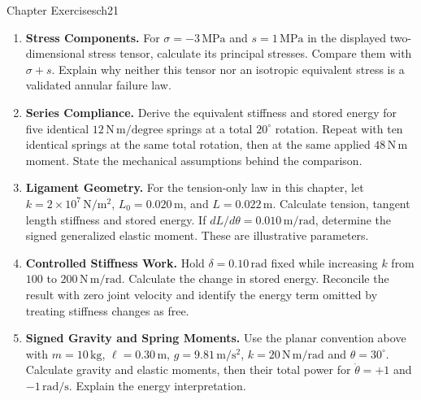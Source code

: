 \begin{exercises}{Chapter Exercises}{ch21}
\begin{enumerate}[leftmargin=*,itemsep=8pt,topsep=4pt]
\item \begin{minipage}[t]{\linewidth}
\textbf{Stress Components.} For $\sigma=-3\,\mathrm{MPa}$ and $s=1\,\mathrm{MPa}$ in the displayed two-dimensional stress tensor, calculate its principal stresses. Compare them with $\sigma+s$. Explain why neither this tensor nor an isotropic equivalent stress is a validated annular failure law.
\end{minipage}

\item \begin{minipage}[t]{\linewidth}
\textbf{Series Compliance.} Derive the equivalent stiffness and stored energy for five identical $12\,\mathrm{N\,m/degree}$ springs at a total $20^\circ$ rotation. Repeat with ten identical springs at the same total rotation, then at the same applied $48\,\mathrm{N\,m}$ moment. State the mechanical assumptions behind the comparison.
\end{minipage}

\item \begin{minipage}[t]{\linewidth}
\textbf{Ligament Geometry.} For the tension-only law in this chapter, let $k=2\times10^7\,\mathrm{N/m^2}$, $L_0=0.020\,\mathrm m$, and $L=0.022\,\mathrm m$. Calculate tension, tangent length stiffness and stored energy. If $dL/d\theta=0.010\,\mathrm{m/rad}$, determine the signed generalized elastic moment. These are illustrative parameters.
\end{minipage}

\item \begin{minipage}[t]{\linewidth}
\textbf{Controlled Stiffness Work.} Hold $\delta=0.10\,\mathrm{rad}$ fixed while increasing $k$ from $100$ to $200\,\mathrm{N\,m/rad}$. Calculate the change in stored energy. Reconcile the result with zero joint velocity and identify the energy term omitted by treating stiffness changes as free.
\end{minipage}

\item \begin{minipage}[t]{\linewidth}
\textbf{Signed Gravity and Spring Moments.} Use the planar convention above with $m=10\,\mathrm{kg}$, $\ell=0.30\,\mathrm m$, $g=9.81\,\mathrm{m/s^2}$, $k=20\,\mathrm{N\,m/rad}$ and $\theta=30^\circ$. Calculate gravity and elastic moments, then their total power for $\dot\theta=+1$ and $-1\,\mathrm{rad/s}$. Explain the energy interpretation.
\end{minipage}


\end{enumerate}
\end{exercises}
